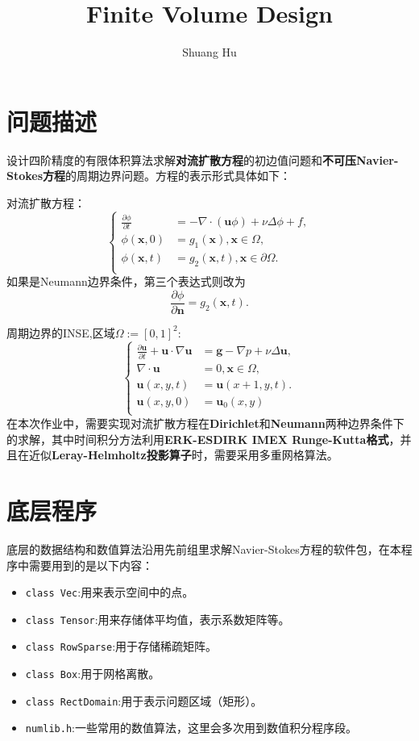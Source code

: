 \documentclass[UTF8]{ctexart}
\title{Finite Volume Design}
\author{Shuang Hu}
\theoremstyle{plain}
\theoremstyle{definition}
\theoremstyle{remark}
\newcommand{\pdfFrac}[2]{\frac{\partial #1}{\partial #2}}
\begin{document}
\maketitle
\section{问题描述}
设计四阶精度的有限体积算法求解\textbf{对流扩散方程}的初边值问题和\textbf{不可压Navier-Stokes方程}的周期边界问题。方程的表示形式具体如下：

对流扩散方程：
\begin{equation}
    \left\{
        \begin{aligned}
            \pdfFrac{\phi}{t}&=-\nabla\cdot(\mathbf{u}\phi)+\nu\Delta\phi+f,\\
            \phi(\mathbf{x},0)&=g_{1}(\mathbf{x}),\mathbf{x}\in\Omega,\\
            \phi(\mathbf{x},t)&=g_{2}(\mathbf{x},t),\mathbf{x}\in\partial\Omega.\\
        \end{aligned}
    \right.
\end{equation}
如果是Neumann边界条件，第三个表达式则改为
\begin{equation}
    \pdfFrac{\phi}{\mathbf{n}}=g_{2}(\mathbf{x},t).
\end{equation}

周期边界的INSE,区域$\Omega:=[0,1]^2$:
\begin{equation}
    \left\{
        \begin{aligned}
            \pdfFrac{\mathbf{u}}{t}+\mathbf{u}\cdot\nabla\mathbf{u}&=\mathbf{g}-\nabla p+\nu\Delta\mathbf{u},\\
            \nabla\cdot\mathbf{u}&=0,\mathbf{x}\in\Omega,\\
            \mathbf{u}(x,y,t)&=\mathbf{u}(x+1,y,t).\\
            \mathbf{u}(x,y,0)&=\mathbf{u}_{0}(x,y)\\
        \end{aligned}
    \right.
\end{equation}
在本次作业中，需要实现对流扩散方程在\textbf{Dirichlet}和\textbf{Neumann}两种边界条件下的求解，其中时间积分方法利用\textbf{ERK-ESDIRK IMEX Runge-Kutta格式}，并且在近似\textbf{Leray-Helmholtz投影算子}时，需要采用多重网格算法。
\section{底层程序}
底层的数据结构和数值算法沿用先前组里求解Navier-Stokes方程的软件包，在本程序中需要用到的是以下内容：
\begin{itemize}
    \item \texttt{class Vec}:用来表示空间中的点。
    \item \texttt{class Tensor}:用来存储体平均值，表示系数矩阵等。
    \item \texttt{class RowSparse}:用于存储稀疏矩阵。
    \item \texttt{class Box}:用于网格离散。
    \item \texttt{class RectDomain}:用于表示问题区域（矩形）。
    \item \texttt{numlib.h}:一些常用的数值算法，这里会多次用到数值积分程序段。
\end{itemize}
\end{document}
